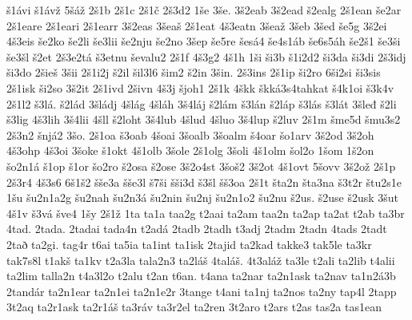 {    š1ávi
    š1ávž
    5šáž
    2š1b
    2š1c
    2š1č
    2š3d2
    1še
    3še.
    3š2eab
    3š2ead
    š2ealg
    2š1ean
    še2ar
    2š1eare
    2š1eari
    2š1earr
    3š2eas
    3šeaš
    2š1eat
    4š3eatn
    3šeaž
    3šeb
    3šed
    še5g
    3š2ei
    4š3eis
    še2ko
    še2li
    še3lii
    še2nju
    še2no
    3šep
    še5re
    šesá4
    še4s1áb
    še6s5áh
    še2š1
    še3ši
    še3šl
    š2et
    2š3e2tá
    š3etnu
    ševalu2
    2š1f
    4š3g2
    4š1h
    1ši
    ši3b
    š1i2d2
    ši3da
    ši3di
    2š3idj
    ši3do
    2šieš
    3šii
    2š1i2j
    š2il
    šil3l6
    šim2
    š2in
    3šin.
    2š3ins
    2š1ip
    ši2ro
    6ši2si
    ši3sis
    2š1isk
    ši2so
    3š2it
    2š1ivd
    2šivn
    4š3j
    šjoh1
    2š1k
    4škk
    škká3s4tahkat
    š4k1oi
    š3k4v
    2š1l2
    š3lá.
    š2lád
    3šládj
    4šlág
    4šláh
    3š4láj
    š2lám
    š3lán
    š2láp
    š3lás
    š3lát
    3šleđ
    š2li
    š3lig
    4š3lih
    3š4lii
    4šll
    š2loht
    3š4lub
    4šlud
    4šluo
    3š4lup
    š2luv
    2š1m
    šme5d
    šmu3s2
    2š3n2
    šnjá2
    3šo.
    2š1oa
    š3oab
    4šoai
    3šoalb
    3šoalm
    š4oar
    šo1arv
    3š2od
    3š2oh
    4š3ohp
    4š3oi
    3šoke
    š1okt
    4š1olb
    3šole
    2š1olg
    3šoli
    4š1olm
    šol2o
    1šom
    1š2on
    šo2n1á
    š1op
    š1or
    šo2ro
    š2osa
    š2ose
    3š2o4st
    3šoš2
    3š2ot
    4š1ovt
    5šovv
    3š2ož
    2š1p
    2š3r4
    4š3s6
    6š1š2
    šše3a
    šše3l
    š7ši
    šši3d
    š3šl
    šš3oa
    2š1t
    šta2n
    šta3na
    š3t2r
    štu2s1e
    1šu
    šu2n1a2g
    šu2nah
    šu2n3á
    šu2nin
    šu2nj
    šu2n1o2
    šu2nu
    š2us.
    š2use
    š2usk
    3šut
    4š1v
    š3vá
    šve4
    1šy
    2š1ž
    1ta
    ta1a
    taa2g
    t2aai
    ta2am
    taa2n
    ta2ap
    ta2at
    t2ab
    ta3br
    4tad.
    2tada.
    2tadai
    tada4n
    t2adá
    2tadb
    2tadh
    t3adj
    2tadm
    2tadn
    4tads
    2tadt
    2tað
    ta2gi.
    tag4r
    t6ai
    ta5ia
    ta1int
    ta1isk
    2tajid
    ta2kad
    takke3
    tak5le
    ta3kr
    tak7s8l
    t1akš
    ta1kv
    t2a3la
    tala2n3
    ta2láš
    4taláš.
    4t3aláž
    ta3le
    t2ali
    ta2lib
    t4alii
    ta2lim
    talla2n
    t4a3l2o
    t2alu
    t2an
    t6an.
    t4ana
    ta2nar
    ta2n1ask
    ta2nav
    ta1n2á3b
    2tandár
    ta2n1ear
    ta2n1ei
    ta2n1e2r
    3tange
    t4ani
    ta1nj
    ta2nos
    ta2ny
    tap4l
    2tapp
    3t2aq
    ta2r1ask
    ta2r1áš
    ta3ráv
    ta3r2el
    ta2ren
    3t2aro
    t2ars
    t2as
    tas2a
    tas1ean
}
